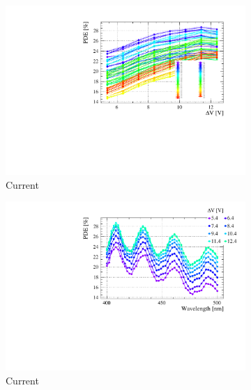 \begin{landscape}
\begin{figure}[htbp]
    \centering
    \begin{subfigure}{0.65\textwidth}
        \includegraphics[width=\linewidth]{gfx/plots/PDE/16/c_Current_Bias.pdf}  
        \caption{Current}
    \end{subfigure}
    \begin{subfigure}{0.65\textwidth}
        \includegraphics[width=\linewidth]{gfx/plots/PDE/16/c_Current_Wavelength.pdf}  
        \caption{Current}
    \end{subfigure}
    \\
    \begin{subfigure}{0.65\textwidth}

\end{subfigure}
\end{figure}
\end{landscape}
